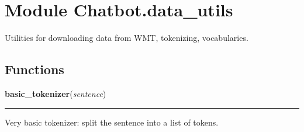 %
%
%


\section{Module Chatbot.data\_utils}

    \label{Chatbot:data_utils}
Utilities for downloading data from WMT, tokenizing, vocabularies.



  \subsection{Functions}

    \label{Chatbot:data_utils:basic_tokenizer}

    \vspace{0.5ex}

\hspace{.8\funcindent}\begin{boxedminipage}{\funcwidth}

    \raggedright \textbf{basic\_tokenizer}(\textit{sentence})

    \vspace{-1.5ex}

    \rule{\textwidth}{0.5\fboxrule}
\setlength{\parskip}{2ex}
    Very basic tokenizer: split the sentence into a list of tokens.

\setlength{\parskip}{1ex}
    \end{boxedminipage}

    \label{Chatbot:data_utils:create_vocabulary}

